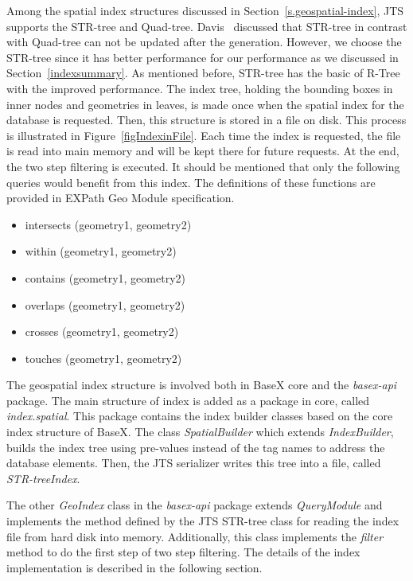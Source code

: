 \documentclass[a4paper,12pt]{article}
\begin{document}
Among the spatial index structures discussed in Section~\ref{s.geospatial-index}, JTS supports the STR-tree and Quad-tree. Davis~\cite{jts-presentation} discussed that STR-tree in contrast with Quad-tree can not be updated after the generation. However, we choose the STR-tree since it has better performance for our performance as we discussed in Section~\ref{indexsummary}. As mentioned before, STR-tree has the basic of R-Tree with the improved performance. The index tree, holding the bounding boxes in inner nodes and geometries in leaves, is made once when the spatial index for the database is requested. Then, this structure is stored in a file on disk. This process is illustrated in Figure~\ref{figIndexinFile}. Each time the index is requested, the file is read 
into main memory and will be kept there for future requests.
At the end, the two step filtering is executed. 
It should be mentioned that only the following queries would benefit from this index. The definitions of these functions are provided in EXPath Geo Module specification.
\begin{itemize}
\item intersects (geometry1, geometry2)
\item within (geometry1, geometry2)
\item contains (geometry1, geometry2)
\item overlaps (geometry1, geometry2)
\item crosses (geometry1, geometry2)
\item touches (geometry1, geometry2)
\end{itemize}

The geospatial index structure is involved both in BaseX core and the \textit{basex-api} package. The main structure of index is added as a package in core, called \textit{index.spatial}. This package contains the index builder classes based on the core index structure of BaseX. The class \textit{SpatialBuilder} which extends \textit{IndexBuilder}, builds the index tree using pre-values instead of the tag names to address the database elements. Then, the JTS serializer writes this tree into a file, called \textit{STR-treeIndex}.

The other \textit{GeoIndex} class in the \textit{basex-api} package extends \textit{QueryModule} and implements the method defined by the JTS STR-tree class for reading the index file from hard disk into memory. Additionally, this class implements the \textit{filter} method to do the first step of two step filtering. The details of the index implementation is described in the following section.
 
\end{document}
